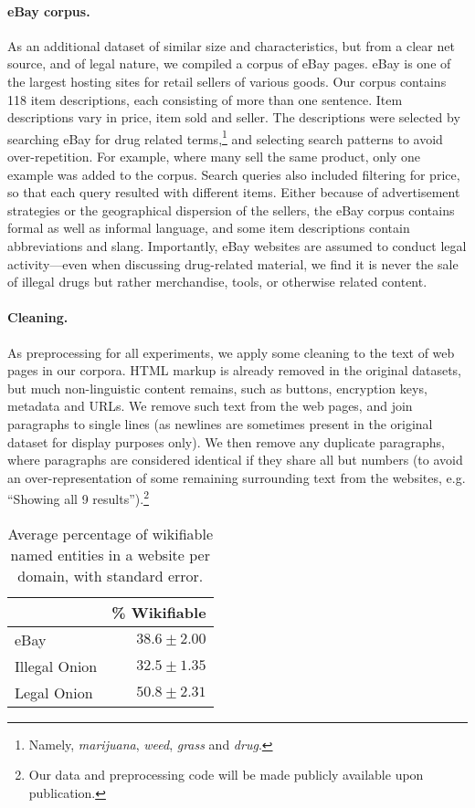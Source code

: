 \documentclass[11pt,a4paper,table]{article}
\begin{document}
\paragraph{eBay corpus.}
As an additional dataset of similar size and characteristics,
but from a clear net source, and of legal nature,
we compiled a corpus of eBay pages.
eBay is one of the largest hosting sites for retail sellers of various goods. Our corpus contains 118 item descriptions, each consisting of more than one sentence.
Item descriptions vary in price, item sold and seller. The descriptions were selected by searching eBay for drug related terms,\footnote{Namely,  \textit{marijuana}, \textit{weed}, \textit{grass} and \textit{drug}.} and selecting search patterns to avoid over-repetition. For example, where many sell the same product, only one example was added to the corpus. Search queries also included filtering for price, so that each query resulted with different items. Either because of advertisement strategies or the geographical dispersion of the  sellers, the eBay corpus contains formal as well as informal language, and some item descriptions contain abbreviations and slang.
Importantly, eBay websites are assumed to conduct legal activity---even
  when discussing drug-related material, we find it is never the sale of illegal
  drugs but rather merchandise, tools, or otherwise related content.

\paragraph{Cleaning.} 
As preprocessing for all experiments, we apply some cleaning to the text
of web pages in our corpora.
HTML markup is already removed in the original datasets,
but much non-linguistic content remains, such as
buttons, encryption keys, metadata and URLs.
We remove such text from the web pages, and join paragraphs 
to single lines (as newlines are sometimes present in the original dataset for display purposes only).
We then remove any duplicate paragraphs, where paragraphs are considered
identical if they share all but numbers (to avoid an over-representation of some remaining surrounding text from the websites, e.g. ``Showing all 9 results'').\footnote{Our data and preprocessing code  will be made publicly available upon publication.}

\begin{table}
\begin{center}
\begin{tabular}{l|r}
 & \% Wikifiable\\
 \hline
eBay & $38.6 \pm2.00$\\
Illegal Onion & $32.5 \pm1.35$\\
Legal Onion & $50.8 \pm2.31$
\end{tabular}
\end{center}
\caption{Average percentage of wikifiable named entities in a website per domain, with standard error.\label{ta:wiki}}
\end{table}
\end{document}
